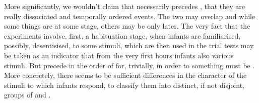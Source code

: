 More significantly, we wouldn't claim that  necessarily
precedes , that they are really dissociated and temporally
ordered events. The two may overlap and while some things are  at
some stage, others may be  only later.  The very fact that the
experiments involve, first, a habituation stage, when infants are familiarised,
possibly, desentisised, to some stimuli, which are then used in the trial tests
may be taken as an indicator that from the very first hours infants also
 various stimuli.
But  precede  in the order of 
for, trivially, in order to  something must be
. More concretely, there seems to be sufficient
differences in the character of the stimuli to which infants respond, to
classify them into distinct, if not disjoint, groups of  and
. 


